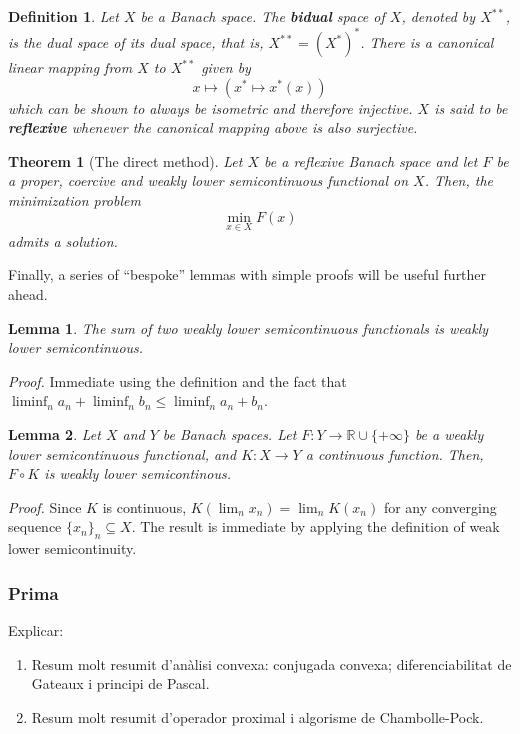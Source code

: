 \documentclass[twocolumn,twoside,a4paper,10pt]{IEEEtran}
\newtheorem{definition}{Definition}
\newtheorem{theorem}{Theorem}
\newtheorem{lemma}{Lemma}
\begin{document}
\begin{definition}
  Let \(X\) be a Banach space. The \textbf{bidual} space of \(X\), denoted by \(X^{**}\), is the dual space of its dual space, that is, \(X^{**}=(X^*)^*\). There is a canonical linear mapping from \(X\) to \(X^{**}\) given by
  \[
    x\mapsto(x^*\mapsto x^*(x))
  \]
  which can be shown to always be isometric and therefore injective. \(X\) is said to be \textbf{reflexive} whenever the canonical mapping above is also surjective.
\end{definition}

\begin{theorem}[The direct method]\label{thm:direct-method}
  Let \(X\) be a reflexive Banach space and let \(F\) be a proper, coercive and weakly lower semicontinuous functional on \(X\). Then, the minimization problem
  \[
    \min_{x\in X} F(x)
  \]
  admits a solution.
\end{theorem}

Finally, a series of ``bespoke'' lemmas with simple proofs will be useful further ahead.

\begin{lemma}\label{lemma:sum-of-lsc}
  The sum of two weakly lower semicontinuous functionals is weakly lower semicontinuous.
\end{lemma}

\textit{Proof.} Immediate using the definition and the fact that \(\liminf_n{a_n} + \liminf_n{b_n}\leq \liminf_n{a_n + b_n}\).

\begin{lemma}\label{lemma:precomposition-with-linear}
  Let \(X\) and \(Y\) be Banach spaces. Let \(F\colon Y\to \mathbb{R}\cup\{+\infty\}\) be a weakly lower semicontinuous functional, and \(K\colon X\to Y\) a continuous function. Then, \(F\circ K\) is weakly lower semicontinous.
\end{lemma}

\textit{Proof.} Since \(K\) is continuous, \(K(\lim_n x_n) = \lim_n K(x_n)\) for any converging sequence \(\{x_n\}_n\subseteq X\). The result is immediate by applying the definition of weak lower semicontinuity.

\subsubsection{Prima}
Explicar:
\begin{enumerate}
  \item Resum molt resumit d'anàlisi convexa: conjugada convexa; diferenciabilitat de Gateaux i principi de Pascal.
  \item Resum molt resumit d'operador proximal i algorisme de Chambolle-Pock.
\end{enumerate}
\end{document}
